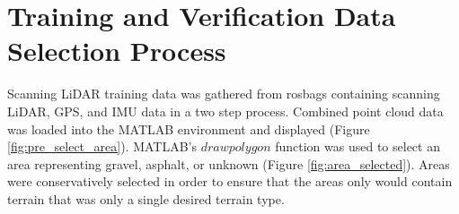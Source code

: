\documentclass[numbered,pdftex]{ohio-etd}
\begin{document}
{{	} %

	\section{Training and Verification Data Selection Process}\label{sec:training_and_verification_data_selection_process}{

		{Scanning LiDAR training data was gathered from rosbags containing scanning LiDAR, GPS, and IMU data in a two step process. Combined point cloud data was loaded into the MATLAB environment and displayed (Figure \ref{fig:pre_select_area}). MATLAB's $drawpolygon$ function was used to select an area representing gravel, asphalt, or unknown (Figure \ref{fig:area_selected}). Areas were conservatively selected in order to ensure that the areas only would contain terrain that was only a single desired terrain type. }

}}
\end{document}
